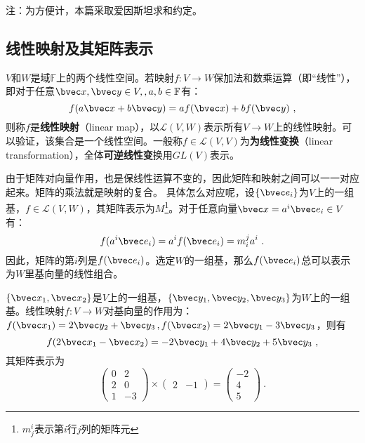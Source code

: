 
\begin{issues}
\issueDraft
\end{issues}
注：为方便计，本篇采取爱因斯坦求和约定。
\subsection{线性映射及其矩阵表示}
$V$和$W$是域$\mathbb F$上的两个线性空间。若映射$f:V\rightarrow W$保加法和数乘运算（即“线性”），即对于任意$\bvec x,\bvec y \in V,,a,b\in\mathbb F$有：
\begin{equation}
f(a\bvec x+b\bvec y)=af(\bvec x)+bf(\bvec y)
~,\end{equation}
则称$f$是\textbf{线性映射}（linear map），以$\mathcal L(V,W)$表示所有$V\rightarrow W$上的线性映射。可以验证，该集合是一个线性空间。一般称$f\in \mathcal L(V,V)$为\textbf{为线性变换}（linear transformation），全体\textbf{可逆线性变}换用$GL(V)$表示。

由于矩阵对向量作用，也是保线性运算不变的，因此矩阵和映射之间可以一一对应起来。矩阵的乘法就是映射的复合。
具体怎么对应呢，设$\{\bvec e_i\}$为$V$上的一组基，$f\in\mathcal L(V,W)$，其矩阵表示为$M$\footnote{$m^i_j$表示第$i$行$j$列的矩阵元}。对于任意向量$\bvec x=a^i\bvec e_i\in V$有：
\begin{equation}
f(a^i\bvec e_i)=a^if(\bvec e_i)=m^j_i a^i~.
\end{equation}
因此，矩阵的第$i$列是$f(\bvec e_i)$。选定$W$的一组基，那么$f(\bvec e_i)$总可以表示为$W$里基向量的线性组合。
\begin{example}{}
$\{\bvec x_1,\bvec x_2\}$是$V$上的一组基，$\{\bvec y_1,\bvec y_2,\bvec y_3\}$为$W$上的一组基。线性映射$f:V\rightarrow W$对基向量的作用为：$f(\bvec x_1)=2\bvec y_2+\bvec y_3\,,f(\bvec x_2)=2\bvec y_1-3\bvec y_3$，则有
\begin{equation}
f(2\bvec  x_1-\bvec x_2)=-2\bvec y_1+4\bvec y_2+5\bvec y_3~,
\end{equation}其矩阵表示为
\begin{equation}
\begin{pmatrix}
  0& 2\\
  2& 0\\
 1 &-3
\end{pmatrix}\times \begin{pmatrix}
 2 &-1
\end{pmatrix}=\begin{pmatrix}
-2 \\
 4\\
5
\end{pmatrix}~.
\end{equation}
\end{example}
